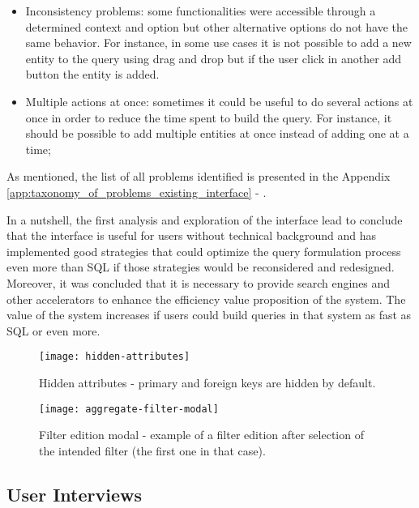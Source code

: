 \begin{itemize}
    \item Inconsistency problems: some functionalities were accessible through a determined context and option but other alternative options do not have the same behavior. For instance, in some use cases it is not possible to add a new entity to the query using drag and drop but if the user click in another add button the entity is added.
    \item Multiple actions at once: sometimes it could be useful to do several actions at once in order to reduce the time spent to build the query. For instance, it should be possible to add multiple entities at once instead of adding one at a time; 
\end{itemize}

As mentioned, the list of all problems identified is presented in the Appendix \ref{app:taxonomy_of_problems_existing_interface} - .

In a nutshell, the first analysis and exploration of the interface lead to conclude that the interface is useful for users without technical background and has implemented good strategies that could optimize the query formulation process even more than \gls{SQL} if those strategies would be reconsidered and redesigned. Moreover, it was concluded that it is necessary to provide search engines and other accelerators to enhance the efficiency value proposition of the system. The value of the system increases if users could build queries in that system as fast as \gls{SQL} or even more.

\begin{figure}[htbp]
	\centering
	\texttt{[image: hidden-attributes]}
	\caption{Hidden attributes - primary and foreign keys are hidden by default.}
	\label{fig:hiddenAttributes}
\end{figure}

\begin{figure}[htbp]
	\centering
	\texttt{[image: aggregate-filter-modal]}
	\caption{Filter edition modal - example of a filter edition after selection of the intended filter (the first one in that case).}
	\label{fig:aggregateFilterModal}
\end{figure}

\subsection{User Interviews}
\label{subsec:user_interviews}

